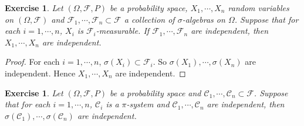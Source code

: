 \documentclass[12pt]{amsart}
\newtheorem{ex}[thm]{Exercise}
\newcommand{\sig}{\sigma}
\newcommand{\Om}{\Omega}
\newcommand{\MC}{\mathcal{C}}
\newcommand{\MF}{\mathcal{F}}
\begin{document}
	\begin{ex}
		Let $(\Om, \MF, P)$ be a probability space, $X_1, \cdots, X_n$ random variables on $(\Om, \MF)$ and $\MF_1, \cdots, \MF_n \subset \MF$ a collection of $\sig$-algebras on $\Om$. Suppose that for each $i = 1, \cdots, n$, $X_i$ is $\MF_i$-measurable. If $\MF_1, \cdots, \MF_n$ are independent, then $X_1, \cdots, X_n$ are independent. 
	\end{ex}
	
	\begin{proof}
		For each $i =1, \cdots, n$, $\sig(X_i) \subset \MF_i$. So $\sig(X_1), \cdots, \sig(X_n)$ are independent. Hence $X_1, \cdots, X_n$ are independent.
	\end{proof}
	
	\begin{ex}
		Let $(\Om, \MF, P)$ be a probability space and $\MC_1, \cdots, \MC_n \subset \MF$. Suppose that for each $i = 1, \cdots, n$, $\MC_i$ is a $\pi$-system and $\MC_1, \cdots, \MC_n$ are independent, then $\sig(\MC_1), \cdots, \sig(\MC_n)$ are independent.
	\end{ex}
	
\end{document}
